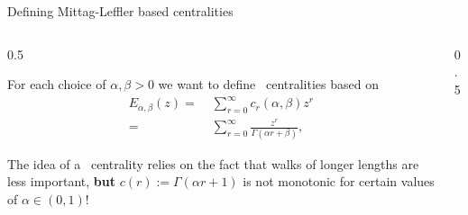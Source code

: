 \documentclass[aspectratio=169,xcolor=dvipsnames]{beamer}
\begin{document}
\begin{frame}{\faLightbulb\; Defining Mittag-Leffler based centralities}
\begin{columns}
\begin{column}{0.5\columnwidth}
\centering
	
For each choice of $\alpha,\beta>0$ we want to define \faWalking\, centralities based on
	\begin{equation*}
	\begin{split}
		E_{\alpha,\beta}(z) = & \;\sum_{r=0}^\infty c_r(\alpha,\beta) z^r \\ = & \; \sum_{r=0}^{\infty} \frac{z^r}{\Gamma(\alpha r + \beta)},
	\end{split}
	\end{equation*}	
	
	
The idea of a \faWalking\, centrality relies on the fact that walks of longer lengths  are less important, \alert{\textbf{but}} $c(r):=\Gamma(\alpha r+1)$ is not monotonic for certain values of $\alpha\in(0,1)$!

\end{column}
\begin{column}{0.5\columnwidth}
\centering

\end{column}
\end{columns}
\end{frame}
\end{document}
